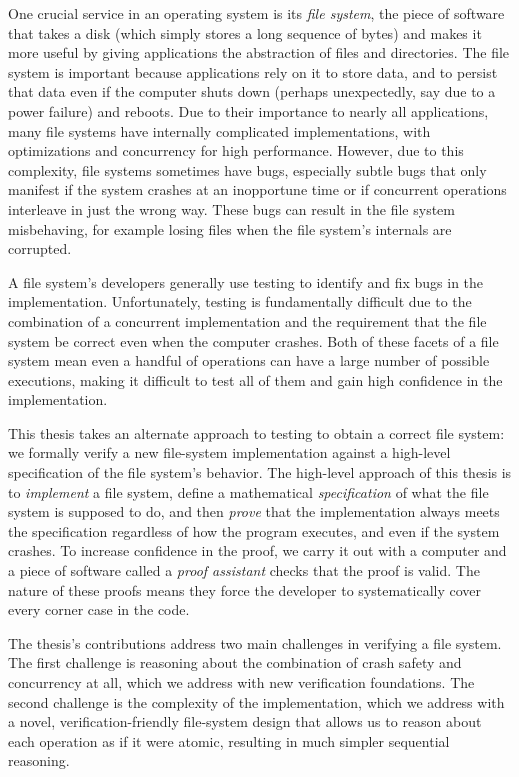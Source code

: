 One crucial service in an operating system is its \emph{file system}, the piece
of software that takes a disk (which simply stores a long sequence of bytes) and
makes it more useful by giving applications the abstraction of files and directories. The file
system is important because applications rely on it to store data, and to
persist that data even if the computer shuts down (perhaps unexpectedly, say due
to a power failure) and reboots. Due to their importance to nearly all applications, many
file systems have internally complicated implementations, with optimizations and
concurrency for high performance. However, due to this complexity, file systems
sometimes have bugs, especially subtle bugs that only manifest if the system
crashes at an inopportune time or if concurrent operations interleave in just
the wrong way. These bugs can result in the file system misbehaving, for example
losing files when the file system's internals are corrupted.

A file system's developers generally use testing to identify and fix bugs in the
implementation. Unfortunately, testing is fundamentally difficult due to the
combination of a concurrent implementation and the requirement that the file
system be correct even when the computer crashes. Both of these facets of a file
system mean even a handful of operations can have a large number of possible
executions, making it difficult to test all of them and gain high confidence in the
implementation.

This thesis takes an alternate approach to testing to obtain a correct file
system: we formally verify a new file-system implementation against a high-level
specification of the file system's behavior. The high-level approach of this
thesis is to \emph{implement} a file system, define a mathematical
\emph{specification} of what the file system is supposed to do, and then
\emph{prove} that the implementation always meets the specification regardless
of how the program executes, and even if the system crashes. To increase confidence in
the proof, we carry it out with a computer and a piece of software called a
\emph{proof assistant} checks that the proof is valid. The nature of these
proofs means they force the developer to systematically cover every corner case
in the code.

The thesis's contributions address two main challenges in verifying a file system. The
first challenge is reasoning about the combination of crash safety and
concurrency at all, which we address with new verification foundations.
The second challenge is the complexity of the implementation, which we address
with a novel, verification-friendly file-system design that allows us to reason
about each operation as if it were atomic, resulting in much simpler sequential reasoning.

